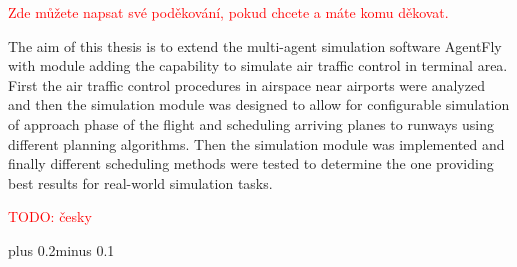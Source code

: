 \documentclass[11pt,oneside,a4paper]{book}
\newcommand{\red}[1] {\textcolor{red}{#1}}
\begin{document}

\coverpagestarts

\acknowledgements
\noindent
\red{Zde můžete napsat své poděkování, pokud chcete a máte komu děkovat.}



 
\abstractpage
The aim of this thesis is to extend the multi-agent simulation software AgentFly with module adding the capability to simulate air traffic control in terminal area. First the air traffic control procedures in airspace near airports were analyzed and then the simulation module was designed to allow for configurable simulation of approach phase of the flight and scheduling arriving planes to runways using different planning algorithms. Then the simulation module was implemented and finally different scheduling methods were tested to determine the one providing best results for real-world simulation tasks.


\baselineskip
\noindent
\red{TODO: česky}


\tableofcontents
\listoffigures
\listoftables


\mainbodystarts
\normalfont
{}\baselineskip plus 0.2\baselineskip minus 0.1\baselineskip













\end{document}
